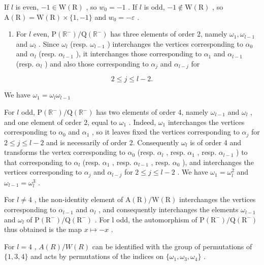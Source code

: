 If \(l\) is even, \(-1 \in \mathrm{W}(\mathrm{R})\) , so \(w_0 = -1\) . If \(l\) is odd, \(-1 \notin \mathrm{W}(\mathrm{R})\) , so \(\mathrm{A}(\mathrm{R}) = \mathrm{W}(\mathrm{R}) \times \{1, -1\}\) and \(w_0 = -\varepsilon\) .

\begin{enumerate}
\def\labelenumi{(\Roman{enumi})}
\setcounter{enumi}{11}
\tightlist
\item
  For \(l\) even, \(\mathrm{P}(\mathbb{R}^{-}) / \mathrm{Q}(\mathbb{R}^{-})\) has three elements of order 2, namely \(\omega_{1}, \omega_{l-1}\) and \(\omega_{l}\) . Since \(\omega_{l}\) (resp. \(\omega_{l-1}\) ) interchanges the vertices corresponding to \(\alpha_{0}\) and \(\alpha_{l}\) (resp. \(\alpha_{l-1}\) ), it interchanges those corresponding to \(\alpha_{1}\) and \(\alpha_{l-1}\) (resp. \(\alpha_{l}\) ) and also those corresponding to \(\alpha_{j}\) and \(\alpha_{l-j}\) for
\end{enumerate}

\[
2 \leqslant j \leqslant l - 2.
\]

We have \(\omega_{1} = \omega_{l}\omega_{l - 1}\)

For \(l\) odd, \(\mathrm{P}(\mathbb{R}^{-}) / \mathrm{Q}(\mathbb{R}^{-})\) has two elements of order 4, namely \(\omega_{l-1}\) and \(\omega_l\) , and one element of order 2, equal to \(\omega_1\) . Indeed, \(\omega_1\) interchanges the vertices corresponding to \(\alpha_0\) and \(\alpha_1\) , so it leaves fixed the vertices corresponding to \(\alpha_j\) for \(2 \leqslant j \leqslant l-2\) and is necessarily of order 2. Consequently \(\omega_l\) is of order 4 and transforms the vertex corresponding to \(\alpha_0\) (resp. \(\alpha_l\) , resp. \(\alpha_1\) , resp. \(\alpha_{l-1}\) ) to that corresponding to \(\alpha_l\) (resp. \(\alpha_1\) , resp. \(\alpha_{l-1}\) , resp. \(\alpha_0\) ), and interchanges the vertices corresponding to \(\alpha_j\) and \(\alpha_{l-j}\) for \(2 \leqslant j \leqslant l-2\) . We have \(\omega_1 = \omega_l^2\) and \(\omega_{l-1} = \omega_l^3\) .

For \(l \neq 4\) , the non-identity element of \(\mathrm{A}(\mathrm{R})/\mathrm{W}(\mathrm{R})\) interchanges the vertices corresponding to \(\alpha_{l-1}\) and \(\alpha_{l}\) , and consequently interchanges the elements \(\omega_{l-1}\) and \(\omega_{l}\) of \(\mathrm{P}(\mathrm{R}^{-})/\mathrm{Q}(\mathrm{R}^{-})\) . For l odd, the automorphism of \(\mathrm{P}(\mathrm{R}^{-})/\mathrm{Q}(\mathrm{R}^{-})\) thus obtained is the map \(x \mapsto -x\) .

For \(l = 4\) , \(A(R)/W(R)\) can be identified with the group of permutations of \(\{1,3,4\}\) and acts by permutations of the indices on \(\{\omega_1,\omega_3,\omega_4\}\) .

